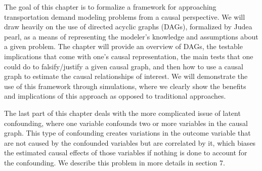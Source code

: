 The goal of this chapter is to formalize a framework for approaching 
transportation demand modeling problems from a causal perspective. We will 
draw heavily on the use of directed acyclic graphs (DAGs), formalized by Judea 
pearl, as a means of representing the modeler's knowledge and assumptions 
about a given problem. The chapter will provide an overview of DAGs, the 
testable implications that come with one's causal representation, the main 
tests that one could do to falsify/justify a given causal graph, and then how 
to use a causal graph to estimate the causal relationships of interest. We 
will demonstrate the use of this framework through simulations, where we 
clearly show the benefits and implications of this approach as opposed to 
traditional approaches. 


The last part of this chapter deals with the more complicated issue of latent 
confounding, where one variable confounds two or more variables in the causal 
graph. This type of confounding creates variations in the outcome variable that are not caused by 
the confounded variables but are correlated by it, which biases the estimated 
causal effects of those variables if nothing is done to account for the 
confounding. We describe this problem in more details in section 7.



